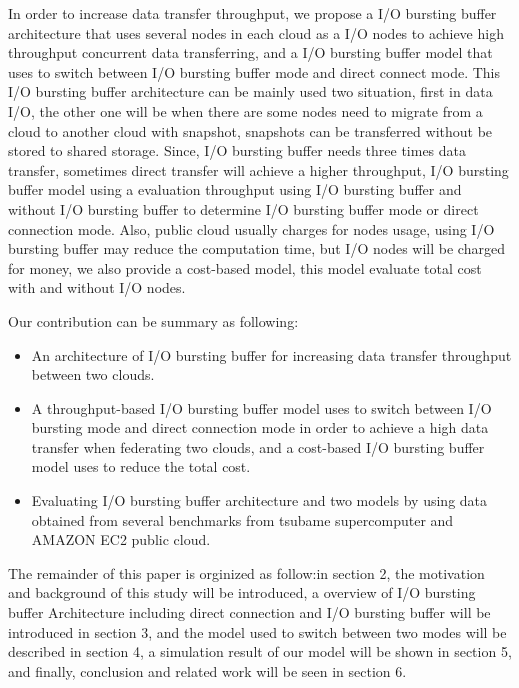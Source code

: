 \documentclass[JIP,draft]{ipsj}
\begin{document}
In order to increase data transfer throughput, we propose a I/O bursting buffer architecture that uses several nodes in each cloud as a I/O nodes to achieve high throughput concurrent data transferring, and a I/O bursting buffer model that uses to switch between I/O bursting buffer mode and direct connect mode.
This I/O bursting buffer architecture can be mainly used two situation, first in data I/O, the other one will be when there are some nodes need to migrate from a cloud to another cloud with snapshot, snapshots can be transferred without be stored to shared storage.
Since, I/O bursting buffer needs three times data transfer, sometimes direct transfer will achieve a higher throughput, I/O bursting buffer model using a evaluation throughput using I/O bursting buffer and without I/O bursting buffer to determine I/O bursting buffer mode or direct connection mode.
Also, public cloud usually charges for nodes usage, using I/O bursting buffer may reduce the computation time, but I/O nodes will be charged for money, we also provide a cost-based model, this model evaluate total cost with and without I/O nodes.

Our contribution can be summary as following:
\begin{itemize}
	\item An architecture of I/O bursting buffer for increasing data transfer throughput between two clouds.
	\item A throughput-based I/O bursting buffer model uses to switch between I/O bursting mode and direct connection mode in order to achieve a high data transfer when federating two clouds, and a cost-based I/O bursting buffer model uses to reduce the total cost.
	\item Evaluating I/O bursting buffer architecture and two models by using data obtained from several benchmarks from tsubame supercomputer and AMAZON EC2 public cloud.
\end{itemize}
The remainder of this paper is orginized as follow:in section 2, the motivation and background of this study will be introduced, a overview of I/O bursting buffer Architecture including direct connection and I/O bursting buffer will be introduced in section 3, and the model used to switch between two modes will be described in section 4, a simulation result of our model %
will be shown in section 5, and finally, conclusion and related work will be seen in section 6.
\end{document}
